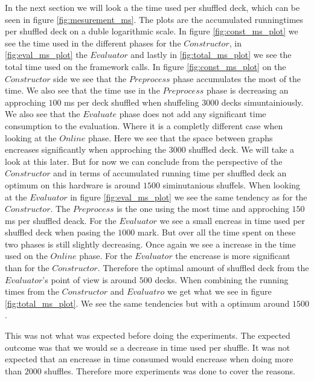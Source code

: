 \documentclass[twoside,11pt,openright]{report}
\begin{document}
In the next section we will look a the time used per shuffled deck, which can be seen in figure \ref{fig:mesurement_ms}. The plots are the accumulated runningtimes per shuffled deck on a duble logarithmic scale. In figure \ref{fig:const_ms_plot} we see the time used in the different phases for the $Constructor$, in \ref{fig:eval_ms_plot} the $Evaluator$ and lastly in \ref{fig:total_ms_plot} we see the total time used on the framework calls. In figure \ref{fig:const_ms_plot} on the $Constructor$ side we see that the $Preprocess$ phase accumulates the most of the time. We also see that the time use in the $Preprocess$ phase is decreasing an approching $100$ ms per deck shuffled when shuffeling $3000$ decks simuntainiously. We also see that the $Evaluate$ phase does not add any significant time consumption to the evaluation. Where it is a completly different case when looking at the $Online$ phase. Here we see that the space between graphs encreases significantly when approching the $3000$ shuffled deck. We will take a look at this later. But for now we can conclude from the perspective of the $Constructor$ and in terms of accumulated running time per shuffled deck an optimum on this hardware is around $1500$ siminutanious shuffels. 
When looking at the $Evaluator$ in figure \ref{fig:eval_ms_plot} we see the same tendency as for the $Constructor$. The $Preprocess$ is the one using the most time and approching $150$ ms per shuffled deack. For the $Evaluator$ we see a small encreas in time used per shuffled deck when pasing the $1000$ mark. But over all the time spent on these two phases is still slightly decreasing. Once again we see a increase in the time used on the $Online$ phase. For the $Evaluator$ the encrease is more significant than for the $Constructor$. Therefore the optimal amount of shuffled deck from the $Evaluator$'s point of view is around $500$ decks.
When combining the running times from the $Constructor$ and $Evaluatro$ we get what we see in figure \ref{fig:total_ms_plot}. We see the same tendencies but with a optimum around $1500$.

This was not what was expected before doing the experiments. The expected outcome was that we would se a decrease in time used per shuffle. It was not expected that an encrease in time consumed would encrease when doing more than $2000$ shuffles. Therefore more experiments was done to cover the reasons.

\bigskip
\end{document}
